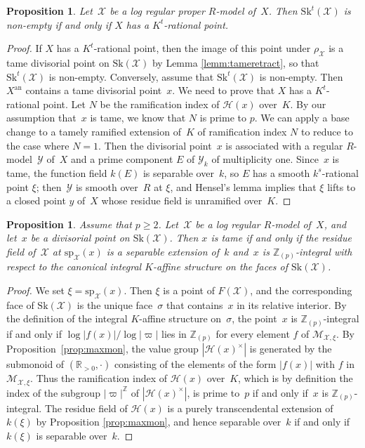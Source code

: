 \documentclass[11pt]{article}
\let\mathcal\mathscr
\newtheorem{prop}[equation]{Proposition}
\theoremstyle{definition}
\numberwithin{equation}{subsection}
\newcommand{\Z}{\ensuremath{\mathbb{Z}}}
\newcommand{\R}{\ensuremath{\mathbb{R}}}
\newcommand{\cX}{\ensuremath{\mathscr{X}}}
\newcommand{\cY}{\ensuremath{\mathscr{Y}}}
\newcommand{\an}{\mathrm{an}}
\newcommand{\Sk}{\mathrm{Sk}}
\newcommand{\spe}{\mathrm{sp}}
\let\unif\varpi
\begin{document}
\begin{prop}\label{prop:nonempty}
Let~$\cX$ be a log regular proper $R$\nobreakdash-model of~$X$. Then $\Sk^t(\cX)$ is non-empty if and only if $X$ has a $K^t$-rational point.
\end{prop}
\begin{proof}
If $X$ has a $K^t$-rational point, then the image of this point under $\rho_{\cX}$ is a tame divisorial point on $\Sk(\cX)$ by Lemma \ref{lemm:tameretract}, so that $\Sk^t(\cX)$ is non-empty.
Conversely, assume that $\Sk^t(\cX)$ is non-empty. Then
$X^{\an}$ contains a tame divisorial point~$x$.
We need to prove that $X$ has a $K^t$-rational point. Let $N$ be the ramification index of $\mathscr{H}(x)$ over~$K$. By our assumption that~$x$ is tame, we know that $N$ is prime to $p$. We can apply a base change to a tamely ramified extension of~$K$ of ramification index $N$ to reduce to the case where $N=1$.
Then the divisorial point~$x$ is associated with
a regular $R$\nobreakdash-model~$\cY$ of~$X$ and a prime component $E$ of $\cY_k$ of multiplicity one.
Since~$x$ is tame, the function field $k(E)$ is separable over~$k$, so $E$ has a smooth $k^s$-rational point $\xi$; then~$\cY$ is smooth over~$R$ at $\xi$, and Hensel's lemma implies that $\xi$ lifts to a closed point $y$ of~$X$ whose residue field is unramified over~$K$.
\end{proof}

\begin{prop}\label{prop:tame}
Assume that $p\geq 2$.
Let~$\cX$ be a log regular $R$\nobreakdash-model of~$X$, and let~$x$ be a divisorial point on $\Sk(\cX)$. Then
$x$ is tame if and only if the residue field of~$\cX$ at $\spe_{\cX}(x)$ is a separable extension of~$k$ and~$x$ is $\Z_{(p)}$-integral with respect to the canonical integral $K$\nobreakdash-affine structure on the faces of $\Sk(\cX)$.
\end{prop}
\begin{proof}
We set $\xi=\spe_{\cX}(x)$. Then $\xi$ is a point of $F(\cX)$, and the corresponding face of $\Sk(\cX)$ is the unique face~$\sigma$ that contains~$x$ in its relative interior. By the definition of the integral $K$\nobreakdash-affine structure on~$\sigma$, the point~$x$ is $\Z_{(p)}$-integral if and only if $\log |f(x)|/\log |\unif|$ lies in $\Z_{(p)}$ for every element $f$ of $\mathcal{M}_{\cX,\xi}$. By Proposition~\ref{prop:maxmon}, the value group $|\mathscr{H}(x)^{\times}|$ is generated by the submonoid of $(\R_{>0},\cdot)$ consisting of the elements of the form $|f(x)|$ with $f$ in $\mathcal{M}_{\cX,\xi}$.
Thus the ramification index of $\mathscr{H}(x)$ over~$K$, which is by definition the index of the subgroup $|\unif|^{\Z}$ of $|\mathscr{H}(x)^{\times}|$, is prime to~$p$ if and only if~$x$ is $\Z_{(p)}$-integral.
The residue field of $\mathscr{H}(x)$ is a purely transcendental extension of $k(\xi)$ by Proposition \ref{prop:maxmon}, and hence separable over~$k$ if and only if $k(\xi)$ is separable over~$k$.
\end{proof}
\end{document}
